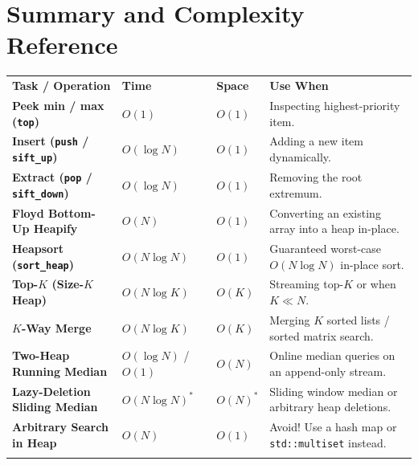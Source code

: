 \documentclass[11pt,a4paper]{article}
\theoremstyle{definition}
\begin{document}
\section{Summary and Complexity Reference}

\begingroup\small{}
\begin{tabularx}{\textwidth}{>{\raggedright\arraybackslash\bfseries}p{4.3cm} >{\centering\arraybackslash}p{2.2cm} >{\centering\arraybackslash}p{1.6cm} >{\raggedright\arraybackslash}X}
\arrayrulecolor{primaryblue}\toprule[1.2pt]
\rowcolor{primaryblue!10}
\textcolor{primaryblue}{\textbf{Task / Operation}} & \textcolor{primaryblue}{\textbf{Time}} & \textcolor{primaryblue}{\textbf{Space}} & \textcolor{primaryblue}{\textbf{Use When}} \\
\arrayrulecolor{codeframe}\midrule[0.6pt]
Peek min / max (\texttt{top}) & $O(1)$ & $O(1)$ & Inspecting highest-priority item. \\
Insert (\texttt{push} / \texttt{sift\_up}) & $O(\log N)$ & $O(1)$ & Adding a new item dynamically. \\
Extract (\texttt{pop} / \texttt{sift\_down}) & $O(\log N)$ & $O(1)$ & Removing the root extremum. \\
Floyd Bottom-Up Heapify & $O(N)$ & $O(1)$ & Converting an existing array into a heap in-place. \\
Heapsort (\texttt{sort\_heap}) & $O(N \log N)$ & $O(1)$ & Guaranteed worst-case $O(N \log N)$ in-place sort. \\
Top-$K$ (Size-$K$ Heap) & $O(N \log K)$ & $O(K)$ & Streaming top-$K$ or when $K \ll N$. \\
$K$-Way Merge & $O(N \log K)$ & $O(K)$ & Merging $K$ sorted lists / sorted matrix search. \\
Two-Heap Running Median & $O(\log N)$ / $O(1)$ & $O(N)$ & Online median queries on an append-only stream. \\
Lazy-Deletion Sliding Median & $O(N \log N)^*$ & $O(N)^*$ & Sliding window median or arbitrary heap deletions. \\
Arbitrary Search in Heap & $O(N)$ & $O(1)$ & Avoid! Use a hash map or \texttt{std::multiset} instead. \\
\arrayrulecolor{primaryblue}\bottomrule[1.2pt]
\end{tabularx}\endgroup

\par{}
\end{document}
